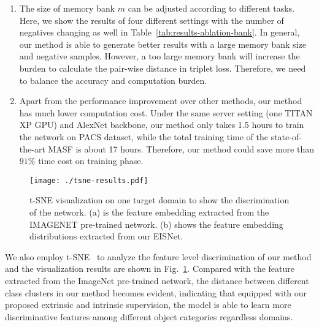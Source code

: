 \begin{enumerate}
	\item The size of memory bank $m$ can be adjusted according to different tasks. Here, we show the results of four different settings with the number of negatives changing as well in Table~\ref{tab:results-ablation-bank}. 
In general, our method is able to generate better results with a large memory bank size and negative samples.
However, a too large memory bank will increase the burden to calculate the pair-wise distance in triplet loss.
	Therefore, we need to balance the accuracy and computation burden.
	\item Apart from the performance improvement over other methods, our method has much lower computation cost. Under the same server setting (one TITAN XP GPU) and AlexNet backbone, our method only takes 1.5 hours to train the network on PACS dataset, while the total training time of the state-of-the-art MASF is about 17 hours. Therefore, our method could save more than $91\%$ time cost on training phase.
\end{enumerate}





\begin{figure}[!t]
	\centering
	\texttt{[image: ./tsne-results.pdf]}
	\caption{
		t-SNE visualization on one target domain to show the discrimination of the network. (a) is the feature embedding extracted from the IMAGENET pre-trained network. (b) shows the feature embedding distributions extracted from our EISNet.
	}
	\label{fig:tsne}
\end{figure}

We also employ t-SNE~\cite{maaten2008visualizing} to analyze the feature level discrimination of our method and the visualization results are shown in Fig.~\ref{fig:tsne}.
Compared with the feature extracted from the ImageNet pre-trained network, the distance between different class clusters in our method becomes evident, indicating that equipped with our proposed extrinsic and intrinsic supervision, the model is able to learn more discriminative features among different object categories regardless domains.
